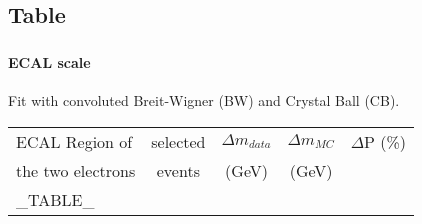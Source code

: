 \subsection{Table}
\color{titlecolor}
\begin{frame}
  \frametitle{\dataSample}
  \framesubtitle{ECAL scale}

  Fit with convoluted Breit-Wigner (BW) and Crystal Ball (CB).


  
  \begin{center}
    \emph{\dataSample}\xspace \invMassVarName

    \begin{tabular}{|l|c|*{3}{c|}} \hline
      ECAL Region of & selected  & $\Delta m_{data}$ & $\Delta m_{MC}$  & $\Delta$P (\%) \\
      the two electrons & events & (GeV) & (GeV) & \\
      \hline
      \hline
      _TABLE_
      \hline		
    \end{tabular}
  \end{center}


\end{frame}


